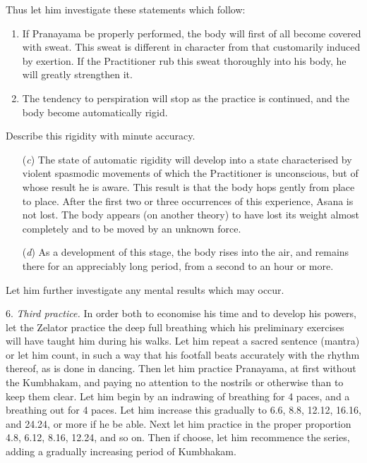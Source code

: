 Thus let him investigate these statements which follow:
\begin{enumerate}[label=(\textit{\alph*})]
\item If Pranayama be properly performed, the body will first of all become covered with sweat. This sweat is different in character from that customarily induced by exertion. If the Practitioner rub this sweat thoroughly into his body, he will greatly strengthen it.
\item The tendency to perspiration will stop as the practice is continued, and the body become automatically rigid.
\end{enumerate}

Describe this rigidity with minute accuracy.

\begin{enumerate}
\item[(\textit{c})] The state of automatic rigidity will develop into a state characterised by violent spasmodic movements of which the Practitioner is unconscious, but of whose result he is aware. This result is that the body hops gently from place to place. After the first two or three occurrences of this experience, Asana is not lost. The body appears (on another theory) to have lost its weight almost completely and to be moved by an unknown force.
\item[(\textit{d})] As a development of this stage, the body rises into the air, and remains there for an appreciably long period, from a second to an hour or more.
\end{enumerate}
Let him further investigate any mental results which may occur.

6. \textit{Third practice.} In order both to economise his time and to develop his powers, let the Zelator practice the deep full breathing which his preliminary exercises will have taught him during his walks. Let him repeat a sacred sentence (mantra) or let him count, in such a way that his footfall beats accurately with the rhythm thereof, as is done in dancing. Then let him practice Pranayama, at first without the Kumbhakam, and paying no attention to the nostrils or otherwise than to keep them clear. Let him begin by an indrawing of breathing for 4 paces, and a breathing out for 4 paces. Let him increase this gradually to 6.6, 8.8, 12.12, 16.16, and 24.24, or more if he be able. Next let him practice in the proper proportion 4.8, 6.12, 8.16, 12.24, and so on. Then if choose, let him recommence the series, adding a gradually increasing period of Kumbhakam.

